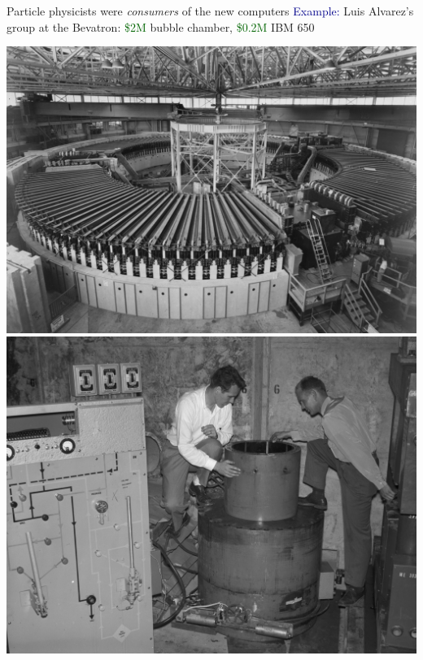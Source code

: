 \documentclass[aspectratio=169]{beamer}
\begin{document}
\begin{frame}{Particle physicists were {\it consumers} of the new computers}
\vspace{0.5 cm}
\textcolor{darkblue}{Example:} Luis Alvarez's group at the Bevatron: \textcolor{darkgreen}{\$2M} bubble chamber, \textcolor{darkgreen}{\$0.2M} IBM 650

\vspace{0.25 cm}
\includegraphics[width=0.45\linewidth]{PLOTS/overall-view-of-bevatron-magnet-photograph-taken-september-6-1955-bevatron-088cb0-1600.jpg}\hfill\includegraphics[width=0.5\linewidth]{PLOTS/alvarez-group-bubble-chamber.jpg}

\vspace{-4 cm}
\end{frame}
\end{document}

